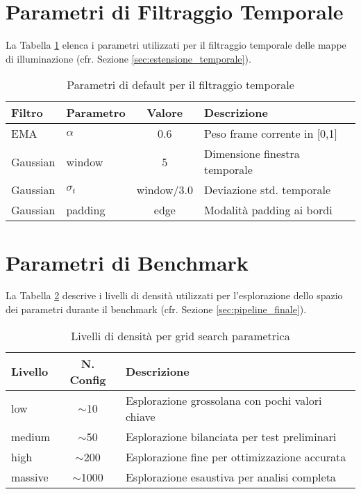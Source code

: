 \section{Parametri di Filtraggio Temporale}\label{app:temporal_params}

La Tabella \ref{tab:temporal_params} elenca i parametri utilizzati per il filtraggio temporale delle mappe di illuminazione (cfr. Sezione \ref{sec:estensione_temporale}).

\begin{table}[htbp]
\centering
\caption{Parametri di default per il filtraggio temporale}
\label{tab:temporal_params}
\begin{tabular}{llcp{5.5cm}}
\toprule
\textbf{Filtro} & \textbf{Parametro} & \textbf{Valore} & \textbf{Descrizione} \\
\midrule
EMA & $\alpha$ & 0.6 & Peso frame corrente in [0,1] \\
\midrule
Gaussian & window & 5 & Dimensione finestra temporale \\
Gaussian & $\sigma_t$ & window/3.0 & Deviazione std. temporale \\
Gaussian & padding & edge & Modalità padding ai bordi \\
\bottomrule
\end{tabular}
\end{table}

\section{Parametri di Benchmark}\label{app:benchmark_params}

La Tabella \ref{tab:benchmark_params} descrive i livelli di densità utilizzati per l'esplorazione dello spazio dei parametri durante il benchmark (cfr. Sezione \ref{sec:pipeline_finale}).

\begin{table}[htbp]
\centering
\caption{Livelli di densità per grid search parametrica}
\label{tab:benchmark_params}
\begin{tabular}{lcp{7cm}}
\toprule
\textbf{Livello} & \textbf{N. Config} & \textbf{Descrizione} \\
\midrule
low & $\sim$10 & Esplorazione grossolana con pochi valori chiave \\
medium & $\sim$50 & Esplorazione bilanciata per test preliminari \\
high & $\sim$200 & Esplorazione fine per ottimizzazione accurata \\
massive & $\sim$1000 & Esplorazione esaustiva per analisi completa \\
\bottomrule
\end{tabular}
\end{table}

